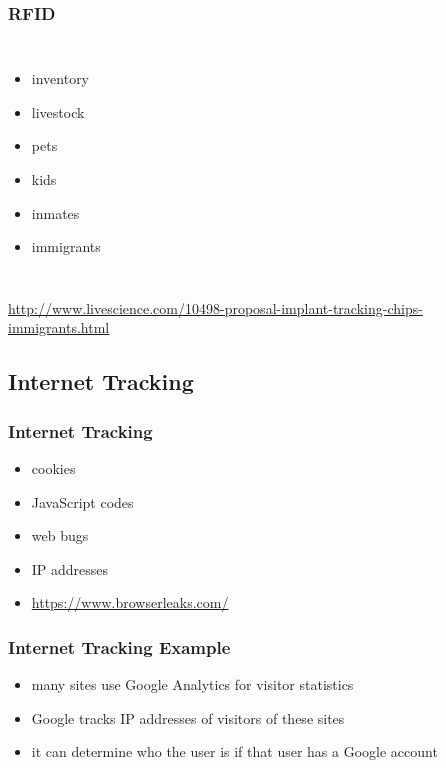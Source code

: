 \documentclass[dvipsnames]{beamer}
\theoremstyle{plain}
\begin{document}
\begin{frame}
  \frametitle{RFID}

  \begin{columns}
    \begin{itemize}
      \item inventory
      \item livestock

      \pause
      \medskip
      \item pets
      \item kids
      \item inmates
      \item immigrants
    \end{itemize}

  \end{columns}

  \medskip
  \tiny{\url{http://www.livescience.com/10498-proposal-implant-tracking-chips-immigrants.html}}\\
\end{frame}

\subsection{Internet Tracking}

\begin{frame}
  \frametitle{Internet Tracking}

  \begin{itemize}
    \item cookies
    \item JavaScript codes
    \item web bugs
    \item IP addresses

    \medskip
    \item \url{https://www.browserleaks.com/}
  \end{itemize}
\end{frame}

\begin{frame}
  \frametitle{Internet Tracking Example}

  \begin{itemize}
    \item many sites use Google Analytics for visitor statistics
    \item Google tracks IP addresses of visitors of these sites
    \item it can determine who the user is if that user has a Google account
  \end{itemize}
\end{frame}
\end{document}
